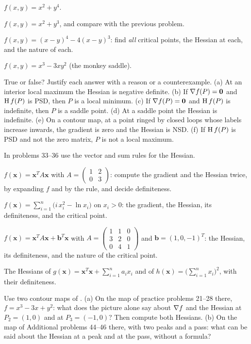 \begin{problems}[resume]
  \item $f(x,y)=x^{2}+y^{4}$.
  \item $f(x,y)=x^{2}+y^{3}$, and compare with the previous problem.
  \item $f(x,y)=(x-y)^{4}-4(x-y)^{3}$: find \emph{all} critical points,
        the Hessian at each, and the nature of each.
  \item $f(x,y)=x^{3}-3xy^{2}$ (the monkey saddle).
  \item True or false? Justify each answer with a reason or a
        counterexample. (a) At an interior local maximum the Hessian is
        negative definite. (b) If $\nabla f(P)=\mathbf{0}$ and $\operatorname{H} f(P)$ is
        PSD, then $P$ is a local minimum. (c) If $\nabla f(P)=\mathbf{0}$ and
        $\operatorname{H} f(P)$ is indefinite, then $P$ is a saddle point. (d) At a
        saddle point the Hessian is indefinite. (e) On a contour map, at a
        point ringed by closed loops whose labels increase inwards, the
        gradient is zero and the Hessian is NSD. (f) If $\operatorname{H} f(P)$ is PSD
        and not the zero matrix, $P$ is not a local maximum.
\end{problems}

In problems 33--36 use the vector and sum rules for the Hessian.

\begin{problems}[resume]
  \item $f(\mathbf{x})=\mathbf{x}^{T}A\mathbf{x}$ with
        $A=\begin{pmatrix}1&2\\0&3\end{pmatrix}$: compute the gradient and
        the Hessian twice, by expanding $f$ and by the rule, and decide
        definiteness.
  \item $f(\mathbf{x})=\sum_{i=1}^{n}\bigl(i\,x_{i}^{2}-\ln x_{i}\bigr)$ on
        $x_{i}>0$: the gradient, the Hessian, its definiteness, and the
        critical point.
  \item $f(\mathbf{x})=\mathbf{x}^{T}A\mathbf{x}+\mathbf{b}^{T}\mathbf{x}$
        with $A=\begin{pmatrix}1&1&0\\3&2&0\\0&4&1\end{pmatrix}$ and
        $\mathbf{b}=(1,0,-1)^{T}$: the Hessian, its definiteness, and the
        nature of the critical point.
  \item The Hessians of $g(\mathbf{x})=\mathbf{x}^{T}\mathbf{x}
        +\sum_{i=1}^{n}a_{i}x_{i}$ and of
        $h(\mathbf{x})=\bigl(\sum_{i=1}^{n}x_{i}\bigr)^{2}$, with their
        definiteness.
  \item Use two contour maps of . (a) On the map of practice
        problems 21--28 there, $f=x^{3}-3x+y^{2}$: what does the picture alone say
        about $\nabla f$ and the Hessian at $P_{2}=(1,0)$ and at
        $P_{3}=(-1,0)$? Then compute both Hessians. (b) On the map of
        Additional problems 44--46 there, with two peaks and a pass: what
        can be said about the Hessian at a peak and at the pass, without a
        formula?
\end{problems}

